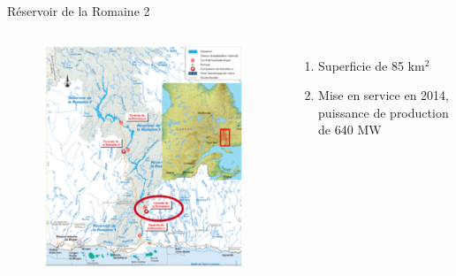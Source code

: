 \documentclass[german,12pt]{beamer}
\begin{document}
\begin{frame}{Réservoir de la Romaine 2}
\begin{columns}
\begin{figure}
\includegraphics[scale=0.5]{ro2.png}
\end{figure}
\begin{enumerate}
\item Superficie de 85 km$^2$ 
\item Mise en service en 2014, puissance de production de 640 MW
 \end{enumerate}
\end{columns}
\end{frame}
\end{document}
